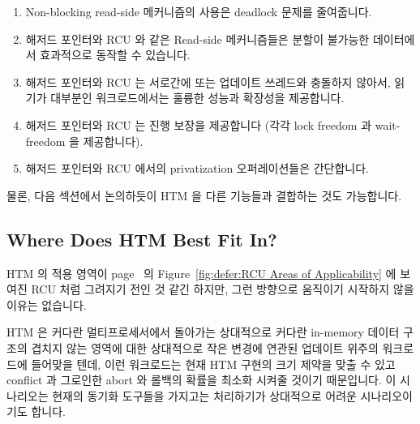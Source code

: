 \begin{enumerate}
\item	Non-blocking read-side 메커니즘의 사용은 deadlock 문제를 줄여줍니다.
\item	해저드 포인터와 RCU 와 같은 Read-side 메커니즘들은 분할이 불가능한
	데이터에서 효과적으로 동작할 수 있습니다.
\item	해저드 포인터와 RCU 는 서로간에 또는 업데이트 쓰레드와 충돌하지 않아서,
	읽기가 대부분인 워크로드에서는 훌륭한 성능과 확장성을 제공합니다.
\item	해저드 포인터와 RCU 는 진행 보장을 제공합니다 (각각 lock freedom 과
	wait-freedom 을 제공합니다).
\item	해저드 포인터와 RCU 에서의 privatization 오퍼레이션들은 간단합니다.
\iffalse

\item	Use of non-blocking read-side mechanisms alleviates deadlock issues.
\item	Read-side mechanisms such as hazard pointers and RCU can operate
	efficiently on non-partitionable data.
\item	Hazard pointers and RCU do not contend with each other or with
	updaters, allowing excellent performance and scalability for
	read-mostly workloads.
\item	Hazard pointers and RCU provide forward-progress guarantees
	(lock freedom and wait-freedom, respectively).
\item	Privatization operations for hazard pointers and RCU are
	straightforward.
\fi
\end{enumerate}

물론, 다음 섹션에서 논의하듯이 HTM 을 다른 기능들과 결합하는 것도 가능합니다.
\iffalse

Of course, it is also possible to augment HTM,
as discussed in the next section.
\fi

\subsection{Where Does HTM Best Fit In?}
\label{sec:future:Where Does HTM Best Fit In?}

HTM 의 적용 영역이
page~\pageref{fig:defer:RCU Areas of Applicability} 의
Figure~\ref{fig:defer:RCU Areas of Applicability} 에 보여진 RCU 처럼 그려지기
전인 것 같긴 하지만, 그런 방향으로 움직이기 시작하지 않을 이유는 없습니다.

HTM 은 커다란 멀티프로세서에서 돌아가는 상대적으로 커다란 in-memory 데이터
구조의 겹치지 않는 영역에 대한 상대적으로 작은 변경에 연관된 업데이트 위주의
워크로드에 들어맞을 텐데, 이런 워크로드는 현재 HTM 구현의 크기 제약을 맞출 수
있고 conflict 과 그로인한 abort 와 롤백의 확률을 최소화 시켜줄 것이기
때문입니다.
이 시나리오는 현재의 동기화 도구들을 가지고는 처리하기가 상대적으로 어려운
시나리오이기도 합니다.
\iffalse

